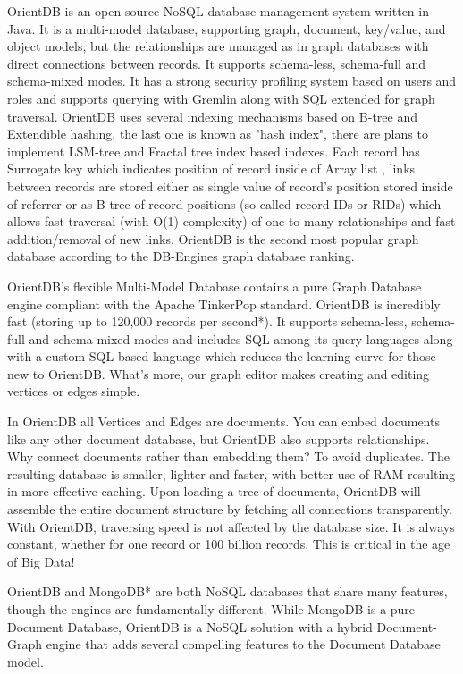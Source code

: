 \documentclass[12pt,a4paper,titlepage]{article}
\begin{document}
\begin{itemize}
OrientDB is an open source NoSQL database management system written in Java. It is a multi-model database, supporting graph, document, key/value, and object models, but the relationships are managed as in graph databases with direct connections between records. It supports schema-less, schema-full and schema-mixed modes. It has a strong security profiling system based on users and roles and supports querying with Gremlin along with SQL extended for graph traversal. OrientDB uses several indexing mechanisms based on B-tree and Extendible hashing, the last one is known as "hash index", there are plans to implement LSM-tree and Fractal tree index based indexes. Each record has Surrogate key which indicates position of record inside of Array list , links between records are stored either as single value of record's position stored inside of referrer or as B-tree of record positions (so-called record IDs or RIDs) which allows fast traversal (with O(1) complexity) of one-to-many relationships and fast addition/removal of new links. OrientDB is the second most popular graph database according to the DB-Engines graph database ranking.

OrientDB’s flexible Multi-Model Database contains a pure Graph Database engine compliant with the Apache TinkerPop standard.
OrientDB is incredibly fast (storing up to 120,000 records per second*). It supports schema-less, schema-full and schema-mixed modes and includes SQL among its query languages along with a custom SQL based language which reduces the learning curve for those new to OrientDB. What’s more, our graph editor makes creating and editing vertices or edges simple.

In OrientDB all Vertices and Edges are documents. You can embed documents like any other document database, but OrientDB also supports relationships. Why connect documents rather than embedding them? To avoid duplicates. The resulting database is smaller, lighter and faster, with better use of RAM resulting in more effective caching. Upon loading a tree of documents, OrientDB will assemble the entire document structure by fetching all connections transparently. With OrientDB, traversing speed is not affected by the database size. It is always constant, whether for one record or 100 billion records. This is critical in the age of Big Data!

OrientDB and MongoDB* are both NoSQL databases that share many features, though the engines are fundamentally different. While MongoDB is a pure Document Database, OrientDB is a NoSQL solution with a hybrid Document-Graph engine that adds several compelling features to the Document Database model.


\end{itemize}
\end{document}

